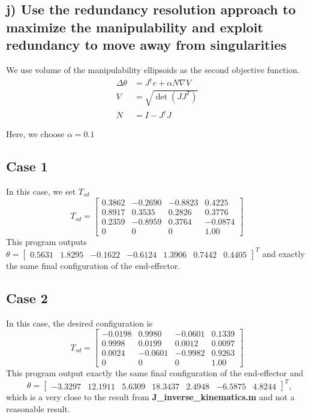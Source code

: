 \documentclass[english,10pt,a4paper]{book}
\begin{document}
    \subsection*{j) Use the redundancy resolution approach to maximize the manipulability and exploit redundancy to move away from singularities}
    We use volume of the manipulability ellipsoids as the second objective function.
    \begin{align}
    	\Delta\theta &= J^\dagger e + \alpha N \nabla V\\ \nonumber
    	V &= \sqrt{\det(J J^T)} \\
    	N &= I - J^\dagger J
    \end{align}
	
	Here, we choose $\alpha = 0.1$
	\subsection*{Case 1}
	In this case, we set $T_{sd}$
	\begin{equation}
		T_{sd} = \begin{bmatrix}
			0.3862 & -0.2690 & -0.8823 & 0.4225\\
			0.8917 & 0.3535 & 0.2826 & 0.3776\\
			0.2359 & -0.8959 & 0.3764 &  -0.0874\\
			0 & 0 & 0 & 1.00
		\end{bmatrix}
	\end{equation}
	This program outputs \(\theta = \begin{bmatrix} 0.5631 & 1.8295 & -0.1622 & -0.6124 & 1.3906 & 0.7442 & 0.4405 \end{bmatrix}^T\) and exactly the same final configuration of the end-effector.
	
	\subsection*{Case 2}
	In this case, the desired configuration is
	\begin{equation}
		T_{sd} = \begin{bmatrix}
			-0.0198 & 0.9980 & -0.0601 & 0.1339\\
			0.9998 & 0.0199 & 0.0012 & 0.0097\\
			0.0024 & -0.0601 & -0.9982 & 0.9263\\
			0 & 0 & 0 & 1.00
		\end{bmatrix}
	\end{equation}
	This program output exactly the same final configuration of the end-effector and \ \ \ \ \ \(\theta = \begin{bmatrix} -3.3297 & 12.1911 & 5.6309 & 18.3437 & 2.4948 & -6.5875 & 4.8244 \end{bmatrix}^T\), which is a very close to the result from \textbf{J\_inverse\_kinematics.m} and not a reasonable result.
	
\end{document}
